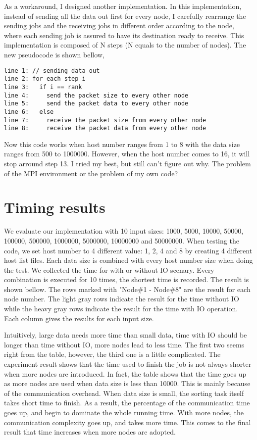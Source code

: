 \documentclass[11pt,letterpaper,oneside]{article}
\begin{document}
As a workaround, I designed another implementation. In this implementation, instead of sending all the data out first for every node, I carefully rearrange the sending jobs and the receiving jobs in different order according to the node, where each sending job is assured to have its destination ready to receive. This implementation is composed of N steps (N equals to the number of nodes). The new pseudocode is shown bellow,
\begin{Verbatim}[frame=single]
line 1: // sending data out
line 2: for each step i
line 3:   if i == rank
line 4:     send the packet size to every other node
line 5:     send the packet data to every other node
line 6:   else
line 7:     receive the packet size from every other node
line 8:     receive the packet data from every other node
\end{Verbatim}
Now this code works when host number ranges from 1 to 8 with the data size ranges from 500 to 1000000. However, when the host number comes to 16, it will stop arround step 13. I tried my best, but still can't figure out why. The problem of the MPI environment or the problem of my own code?

\section{Timing results}
We evaluate our implementation with 10 input sizes: 1000, 5000, 10000, 50000, 100000, 500000, 1000000, 5000000, 10000000 and 50000000. When testing the code, we set host number to 4 different value: 1, 2, 4 and 8 by creating 4 different host list files. Each data size is combined with every host number size when doing the test. We collected the time for with or without IO scenary. Every combination is executed for 10 times, the shortest time is recorded. The result is shown bellow. The rows marked with "Node\#1 - Node\#8" are the result for each node number. The light gray rows indicate the result for the time without IO while the heavy gray rows indicate the result for the time with IO operation. Each column gives the results for each input size.

Intuitively, large data needs more time than small data, time with IO should be longer than time without IO, more nodes lead to less time. The first two seems right from the table, however, the third one is a little complicated. The experiment result shows that the time used to finish the job is not always shorter when more nodes are introduced. In fact, the table shows that the time goes up as more nodes are used when data size is less than 10000. This is mainly because of the communication overhead. When data size is small, the sorting task itself takes short time to finish. As a result, the percentage of the communication time goes up, and begin to dominate the whole running time. With more nodes, the communication complexity goes up, and takes more time. This comes to the final result that time increases when more nodes are adopted. 
\end{document}
